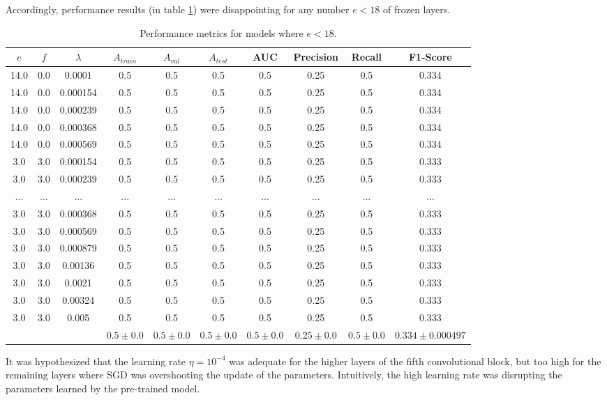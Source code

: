 Accordingly, performance results (in table \ref{table:vgg16_partial}) were disappointing for any number $e < 18$ of frozen layers.


\begin{table}[ht]
\centering
\begin{tabular}{ |c|c|c|c|c|c|c|c|c|c| }
\hline
$e$ & $f$ & $\lambda$ & $A_{train}$ & $A_{val}$ & $A_{test}$ & AUC & Precision & Recall & F1-Score \\
\hline
14.0 & 0.0 & 0.0001 & 0.5 & 0.5 & 0.5 & 0.5 & 0.25 & 0.5 & 0.334 \\
14.0 & 0.0 & 0.000154 & 0.5 & 0.5 & 0.5 & 0.5 & 0.25 & 0.5 & 0.334 \\
14.0 & 0.0 & 0.000239 & 0.5 & 0.5 & 0.5 & 0.5 & 0.25 & 0.5 & 0.334 \\
14.0 & 0.0 & 0.000368 & 0.5 & 0.5 & 0.5 & 0.5 & 0.25 & 0.5 & 0.334 \\
14.0 & 0.0 & 0.000569 & 0.5 & 0.5 & 0.5 & 0.5 & 0.25 & 0.5 & 0.334 \\
3.0 & 3.0 & 0.000154 & 0.5 & 0.5 & 0.5 & 0.5 & 0.25 & 0.5 & 0.333 \\
3.0 & 3.0 & 0.000239 & 0.5 & 0.5 & 0.5 & 0.5 & 0.25 & 0.5 & 0.333 \\
... & ... & ... & ... & ... & ... & ... & ... & ... & ... \\
3.0 & 3.0 & 0.000368 & 0.5 & 0.5 & 0.5 & 0.5 & 0.25 & 0.5 & 0.333 \\
3.0 & 3.0 & 0.000569 & 0.5 & 0.5 & 0.5 & 0.5 & 0.25 & 0.5 & 0.333 \\
3.0 & 3.0 & 0.000879 & 0.5 & 0.5 & 0.5 & 0.5 & 0.25 & 0.5 & 0.333 \\
3.0 & 3.0 & 0.00136 & 0.5 & 0.5 & 0.5 & 0.5 & 0.25 & 0.5 & 0.333 \\
3.0 & 3.0 & 0.0021 & 0.5 & 0.5 & 0.5 & 0.5 & 0.25 & 0.5 & 0.333 \\
3.0 & 3.0 & 0.00324 & 0.5 & 0.5 & 0.5 & 0.5 & 0.25 & 0.5 & 0.333 \\
3.0 & 3.0 & 0.005 & 0.5 & 0.5 & 0.5 & 0.5 & 0.25 & 0.5 & 0.333 \\
\hline
 & & & $0.5\pm0.0$ & $0.5\pm0.0$ & $0.5\pm0.0$ & $0.5\pm0.0$ & $0.25\pm0.0$ & $0.5\pm0.0$ & $0.334\pm0.000497$ \\
\hline
\end{tabular}
\caption{Performance metrics for models where $e < 18$.}
\label{table:vgg16_partial}
\end{table}

It was hypothesized that the learning rate $\eta = 10^{-4}$ was adequate for the higher layers of the fifth convolutional block, but too high for the remaining layers where \ac{SGD} was overshooting the update of the parameters. Intuitively, the high learning rate was disrupting the parameters learned by the pre-trained model.

